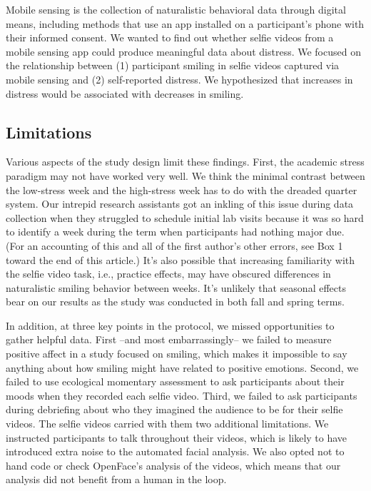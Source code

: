 \documentclass[authordate, empirical]{jote-new-article}
\begin{document}
\begin{originalPurpose}



  Mobile sensing is the collection of naturalistic behavioral data through digital means, including methods that use an app installed on a participant's phone with their informed consent. We wanted to find out whether selfie videos from a mobile sensing app could produce meaningful data about distress. We focused on the relationship between (1) participant smiling in selfie videos captured via mobile sensing and (2) self-reported distress. We hypothesized that increases in distress would be associated with decreases in smiling.

\end{originalPurpose}




\subsection{Limitations}



Various aspects of the study design limit these findings. First, the academic stress paradigm may not have worked very well. We think the minimal contrast between the low-stress week and the high-stress week has to do with the dreaded quarter system. Our intrepid research assistants got an inkling of this issue during data collection when they struggled to schedule initial lab visits because it was so hard to identify a week during the term when participants had nothing major due. (For an accounting of this and all of the first author's other errors, see Box 1 toward the end of this article.) It's also possible that increasing familiarity with the selfie video task, i.e., practice effects, may have obscured differences in naturalistic smiling behavior between weeks. It's unlikely that seasonal effects bear on our results as the study was conducted in both fall and spring terms.



In addition, at three key points in the protocol, we missed opportunities to gather helpful data. First --and most embarrassingly-- we failed to measure positive affect in a study focused on smiling, which makes it impossible to say anything about how smiling might have related to positive emotions. Second, we failed to use ecological momentary assessment to ask participants about their moods when they recorded each selfie video. Third, we failed to ask participants during debriefing about who they imagined the audience to be for their selfie videos. The selfie videos carried with them two additional limitations. We instructed participants to talk throughout their videos, which is likely to have introduced extra noise to the automated facial analysis. We also opted not to hand code or check OpenFace's analysis of the videos, which means that our analysis did not benefit from a human in the loop.
\end{document}
